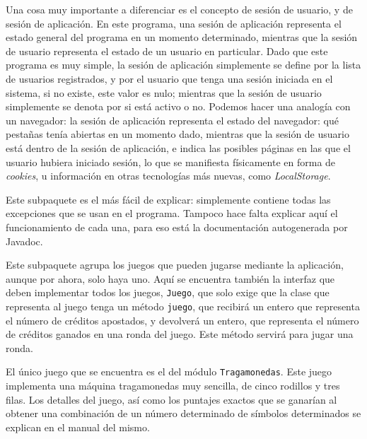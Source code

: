 \documentclass[letterpaper,12pt]{article}
\begin{document}
\begin{description}[style=nextline]
  Una cosa muy importante a diferenciar es el concepto de sesión de usuario, y de sesión de aplicación. En este programa, una sesión de aplicación representa el estado general del programa en un momento determinado, mientras que la sesión de usuario representa el estado de un usuario en particular. Dado que este programa es muy simple, la sesión de aplicación simplemente se define por la lista de usuarios registrados, y por el usuario que tenga una sesión iniciada en el sistema, si no existe, este valor es nulo; mientras que la sesión de usuario simplemente se denota por si está activo o no. Podemos hacer una analogía con un navegador: la sesión de aplicación representa el estado del navegador: qué pestañas tenía abiertas en un momento dado, mientras que la sesión de usuario está dentro de la sesión de aplicación, e indica las posibles páginas en las que el usuario hubiera iniciado sesión, lo que se manifiesta físicamente en forma de \emph{cookies}, u información en otras tecnologías más nuevas, como \emph{LocalStorage}.

\item[\texttt{.excepciones}]
  Este subpaquete es el más fácil de explicar: simplemente contiene todas las excepciones que se usan en el programa. Tampoco hace falta explicar aquí el funcionamiento de cada una, para eso está la documentación autogenerada por Javadoc.

\item[\texttt{.juego}]
  Este subpaquete agrupa los juegos que pueden jugarse mediante la aplicación, aunque por ahora, solo haya uno. Aquí se encuentra también la interfaz que deben implementar todos los juegos, \texttt{Juego}, que solo exige que la clase que representa al juego tenga un método \texttt{juego}, que recibirá un entero que representa el número de créditos apostados, y devolverá un entero, que representa el número de créditos ganados en una ronda del juego. Este método servirá para jugar una ronda.

  El único juego que se encuentra es el del módulo \texttt{Tragamonedas}. Este juego implementa una máquina tragamonedas muy sencilla, de cinco rodillos y tres filas. Los detalles del juego, así como los puntajes exactos que se ganarían al obtener una combinación de un número determinado de símbolos determinados se explican en el manual del mismo.
\end{description}
\end{document}
